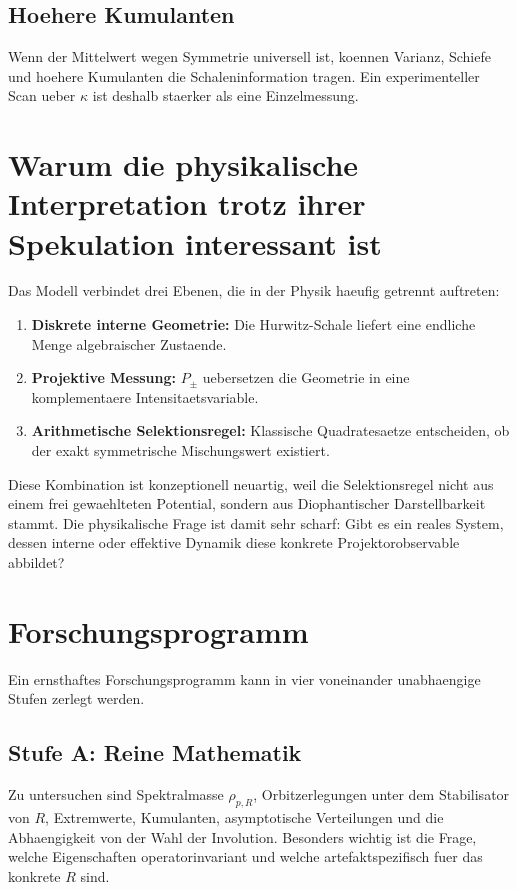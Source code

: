 \documentclass[11pt,a4paper]{article}
\theoremstyle{definition}
\begin{document}
\subsection{Hoehere Kumulanten}
Wenn der Mittelwert wegen Symmetrie universell ist, koennen Varianz, Schiefe und hoehere Kumulanten die Schaleninformation tragen. Ein experimenteller Scan ueber $\kappa$ ist deshalb staerker als eine Einzelmessung.

\section{Warum die physikalische Interpretation trotz ihrer Spekulation interessant ist}
Das Modell verbindet drei Ebenen, die in der Physik haeufig getrennt auftreten:
\begin{enumerate}[leftmargin=1.8em]
\item \textbf{Diskrete interne Geometrie:} Die Hurwitz-Schale liefert eine endliche Menge algebraischer Zustaende.
\item \textbf{Projektive Messung:} $P_\pm$ uebersetzen die Geometrie in eine komplementaere Intensitaetsvariable.
\item \textbf{Arithmetische Selektionsregel:} Klassische Quadratesaetze entscheiden, ob der exakt symmetrische Mischungswert existiert.
\end{enumerate}

Diese Kombination ist konzeptionell neuartig, weil die Selektionsregel nicht aus einem frei gewaehlteten Potential, sondern aus Diophantischer Darstellbarkeit stammt. Die physikalische Frage ist damit sehr scharf: Gibt es ein reales System, dessen interne oder effektive Dynamik diese konkrete Projektorobservable abbildet?

\section{Forschungsprogramm}
Ein ernsthaftes Forschungsprogramm kann in vier voneinander unabhaengige Stufen zerlegt werden.

\subsection{Stufe A: Reine Mathematik}
Zu untersuchen sind Spektralmasse $\rho_{p,R}$, Orbitzerlegungen unter dem Stabilisator von $R$, Extremwerte, Kumulanten, asymptotische Verteilungen und die Abhaengigkeit von der Wahl der Involution. Besonders wichtig ist die Frage, welche Eigenschaften operatorinvariant und welche artefaktspezifisch fuer das konkrete $R$ sind.
\end{document}
